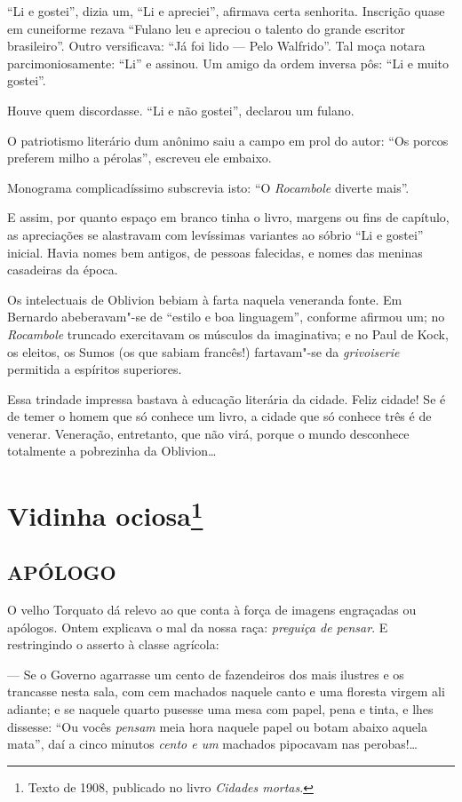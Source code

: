 ``Li e gostei'', dizia um, ``Li e apreciei'', afirmava certa senhorita.
Inscrição quase em cuneiforme rezava ``Fulano leu e apreciou o talento
do grande escritor brasileiro''. Outro versificava: ``Já foi lido ---
Pelo Walfrido''. Tal moça notara parcimoniosamente: ``Li'' e assinou. Um
amigo da ordem inversa pôs: ``Li e muito gostei''.

Houve quem discordasse. ``Li e não gostei'', declarou um fulano.

O patriotismo literário dum anônimo saiu a campo em prol do autor: ``Os
porcos preferem milho a pérolas'', escreveu ele embaixo.

Monograma complicadíssimo subscrevia isto: ``O \emph{Rocambole} diverte
mais''.

E assim, por quanto espaço em branco tinha o livro, margens ou fins de
capítulo, as apreciações se alastravam com levíssimas variantes ao
sóbrio ``Li e gostei'' inicial. Havia nomes bem antigos, de pessoas
falecidas, e nomes das meninas casadeiras da época.

Os intelectuais de Oblivion bebiam à farta naquela veneranda fonte. Em
Bernardo abeberavam"-se de ``estilo e boa linguagem'', conforme afirmou
um; no \emph{Rocambole} truncado exercitavam os músculos da imaginativa;
e no Paul de Kock, os eleitos, os Sumos (os que sabiam francês!)
fartavam"-se da \emph{grivoiserie} permitida a espíritos superiores.

Essa trindade impressa bastava à educação literária da cidade. Feliz
cidade! Se é de temer o homem que só conhece um livro, a cidade que só
conhece três é de venerar. Veneração, entretanto, que não virá, porque o
mundo desconhece totalmente a pobrezinha da Oblivion\ldots{}

\chapter{Vidinha ociosa\footnote[*]{Texto de 1908, publicado no livro \emph{Cidades mortas}.}}

\section*{APÓLOGO}

O velho Torquato dá relevo ao que conta à força de imagens engraçadas ou
apólogos. Ontem explicava o mal da nossa raça: \emph{preguiça de
pensar}. E restringindo o asserto à classe agrícola:

--- Se o Governo agarrasse um cento de fazendeiros dos mais ilustres e
os trancasse nesta sala, com cem machados naquele canto e uma floresta
virgem ali adiante; e se naquele quarto pusesse uma mesa com papel, pena
e tinta, e lhes dissesse: ``Ou vocês \emph{pensam} meia hora naquele
papel ou botam abaixo aquela mata'', daí a cinco minutos \emph{cento e
um} machados pipocavam nas perobas!\ldots{}


